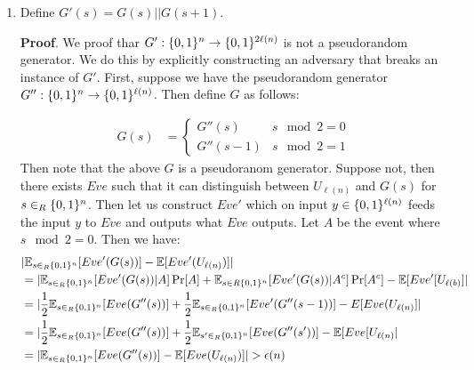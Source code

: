 \documentclass{article}
\begin{document}
\begin{enumerate}
\begin{enumerate}[noitemsep,topsep=\mdcompacttopsep,label=\alph*.]
\item{}Define $G'(s) = G(s) || G(s+1)$.

\begin{mdbmarginx}{1ex}{0pt}{1ex}{0pt}%
\noindent{}\textbf{Proof}.  We proof thar $G': \{0,1\}^{n} \to \{0,1\}^{2\ell(n)}$ is not a pseudorandom generator. We do this
by explicitly constructing an adversary that breaks an instance of $G'$. First, suppose we have
the pseudorandom generator $G'': \{0,1\}^n \to \{0,1\}^{\ell(n)}$. Then define $G$ as follows:%
\end{mdbmarginx}%
\noindent\noindent\[%
\begin{aligned}
G(s) &= \begin{cases}
 G''(s) &  s \mod 2 = 0\\
 G''(s-1) & s \mod 2 = 1
\end{cases}
\end{aligned} 
\]%
Then note that the above $G$ is a pseudoranom generator. Suppose not, then there exists 
$Eve$ such that it can distinguish between $U_{\ell(n)}$ and $G(s)$ for $s \in_R \{0,1\}^n$. 
Then let us construct $Eve'$ which on input $y \in \{0,1\}^{\ell(n)}$ feeds the input $y$ to
$Eve$ and outputs what $Eve$ outputs. Let $A$ be the event where $s \mod 2 = 0$. Then we have:
\noindent\noindent\[%
\begin{aligned}
&|\E_{s \in_R \zo^{n}}[Eve'(G(s))]  - \E[Eve'(U_{\ell(n)}) ]| \\
&= |\E_{s \in_R \zo^{n}}[Eve'(G(s))| A] \Pr[A] + \E_{s \in R \zo^{n}}[Eve'(G(s)) |A^c] \Pr[A^c] - \E[Eve'[U_{\ell(b)}]| \\
&= |\frac{1}{2}\E_{s \in_R \zo^{n}}[Eve(G''(s))] + \frac{1}{2}\E_{s \in_R \zo^{n}}[Eve'(G''(s-1))] - E[Eve(U_{\ell(n)}]| \\
&= |\frac{1}{2}\E_{s \in_R \zo^{n}}[Eve(G''(s))] + \frac{1}{2}\E_{s' \in_R \zo^{n}}[Eve(G''(s'))] - \E[Eve[U_{\ell(n)}| \\
&= |\E_{s \in_R \zo^{n}}[Eve(G''(s))] -\E[Eve(U_{\ell(n)})]| > \epsilon(n)
\end{aligned}  
\]%

\end{enumerate}
\end{enumerate}
\end{document}
